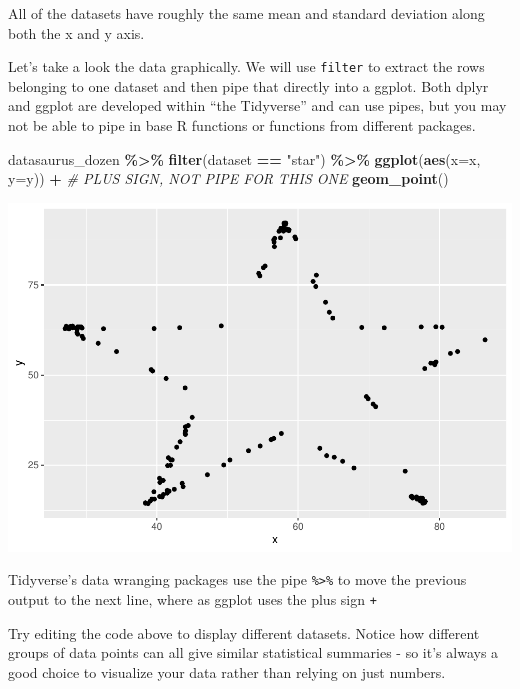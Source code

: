\documentclass[
]{book}
\newenvironment{Shaded}{\begin{snugshade}}{\end{snugshade}}
\newcommand{\AttributeTok}[1]{\textcolor[rgb]{0.13,0.29,0.53}{#1}}
\newcommand{\CommentTok}[1]{\textcolor[rgb]{0.56,0.35,0.01}{\textit{#1}}}
\newcommand{\FunctionTok}[1]{\textcolor[rgb]{0.13,0.29,0.53}{\textbf{#1}}}
\newcommand{\NormalTok}[1]{#1}
\newcommand{\SpecialCharTok}[1]{\textcolor[rgb]{0.81,0.36,0.00}{\textbf{#1}}}
\newcommand{\StringTok}[1]{\textcolor[rgb]{0.31,0.60,0.02}{#1}}
\begin{document}
All of the datasets have roughly the same mean and standard deviation along both the x and y axis.

Let's take a look the data graphically. We will use \texttt{filter} to extract the rows belonging to one dataset and then pipe that directly into a ggplot. Both dplyr and ggplot are developed within ``the Tidyverse'' and can use pipes, but you may not be able to pipe in base R functions or functions from different packages.

\begin{Shaded}
\begin{Highlighting}[]
\NormalTok{datasaurus\_dozen }\SpecialCharTok{\%\textgreater{}\%} 
  \FunctionTok{filter}\NormalTok{(dataset }\SpecialCharTok{==} \StringTok{"star"}\NormalTok{) }\SpecialCharTok{\%\textgreater{}\%} 
  \FunctionTok{ggplot}\NormalTok{(}\FunctionTok{aes}\NormalTok{(}\AttributeTok{x=}\NormalTok{x, }\AttributeTok{y=}\NormalTok{y)) }\SpecialCharTok{+} \CommentTok{\# PLUS SIGN, NOT PIPE FOR THIS ONE}
  \FunctionTok{geom\_point}\NormalTok{()}
\end{Highlighting}
\end{Shaded}

\includegraphics{_main_files/figure-latex/unnamed-chunk-68-1.pdf}

Tidyverse's data wranging packages use the pipe \texttt{\%\textgreater{}\%} to move the previous output to the next line, where as ggplot uses the plus sign \texttt{+}

Try editing the code above to display different datasets. Notice how different groups of data points can all give similar statistical summaries - so it's always a good choice to visualize your data rather than relying on just numbers.
\end{document}

